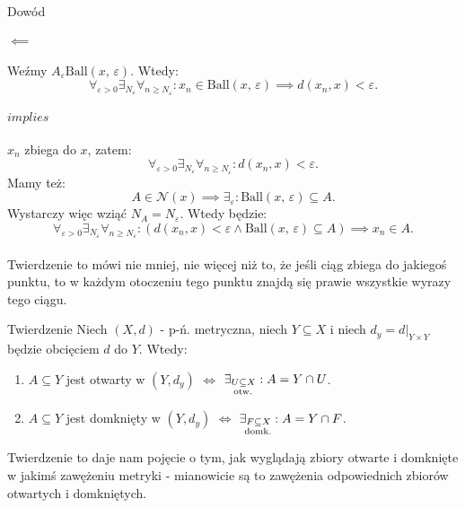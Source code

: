 \documentclass{article}
\newcommand{\eps}{\varepsilon}
\newcommand{\Nau}{\mathcal{N}}
\newcommand{\subotw}{\underset{\clap{\scriptsize otw.}}{\subseteq}}
\newcommand{\subdomk}{\underset{\clap{\scriptsize domk.}}{\subseteq}}
\newcommand{\ball}[2]{\text{Ball}(#1, \, #2)}
\begin{document}
    \begin{dow}{Dowód}
        \paragraph{$\impliedby$} Weźmy $A_\eps  \ball{x}{\eps}$. Wtedy:\begin{equation}
            \forall_{\eps >0} \exists_{N_\eps} \forall_{n \geqslant N_\eps}: x_n \in \ball{x}{\eps} \implies d(x_n, x) < \eps.
        \end{equation}
        \paragraph{$implies$} $x_n$ zbiega do $x$, zatem: \begin{equation*}
            \forall_{\eps >0} \exists_{N_\eps} \forall_{n \geqslant N_\eps}: d(x_n, x) < \eps.
        \end{equation*} Mamy też: \begin{equation*}
            A \in \Nau(x) \implies \exists_\eps: \ball{x}{\eps} \subseteq A.
        \end{equation*} Wystarczy więc wziąć $N_A = N_\eps$. Wtedy będzie: \begin{equation}
            \forall_{\eps >0} \exists_{N_\eps} \forall_{n \geqslant N_\eps}: (d(x_n, x) < \eps \wedge \ball{x}{\eps} \subseteq A) \implies x_n \in A.
        \end{equation}
    \end{dow}

    \paragraph*{} Twierdzenie to mówi nie mniej, nie więcej niż to, że jeśli ciąg zbiega do jakiegoś punktu, to w każdym otoczeniu tego punktu znajdą się prawie wszystkie wyrazy tego ciągu.

    \begin{twier}{Twierdzenie}
        Niech $(X, d)$ - p-ń. metryczna, niech $Y \subseteq X$ i niech $d_y = d | _{Y \times Y}$ będzie obcięciem $d$ do $Y$. Wtedy:
        \begin{enumerate}
            \item $A \subseteq Y$ jest otwarty w $(Y, d_y)$ $\iff$ $\exists_{U \subotw X}: A = Y \cap U$.
            \item $A \subseteq Y$ jest domknięty w $(Y, d_y)$ $\iff$ $\exists_{F \subdomk X}: A = Y \cap F$.
        \end{enumerate}
    \end{twier}
    Twierdzenie to daje nam pojęcie o tym, jak wyglądają zbiory otwarte i domknięte w jakimś zawężeniu metryki - mianowicie są to zawężenia odpowiednich zbiorów otwartych i domkniętych.
\end{document}
